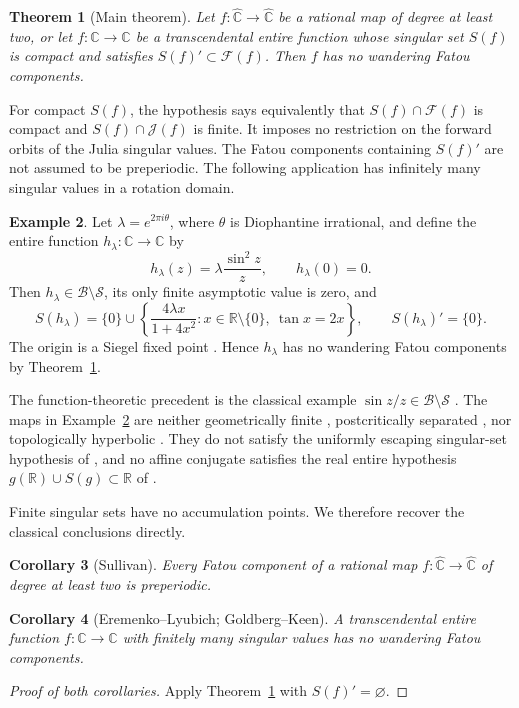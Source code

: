 \documentclass[11pt,reqno]{amsart}
\newcommand{\C}{\mathbb C}
\newcommand{\R}{\mathbb R}
\newcommand{\sphere}{\widehat{\mathbb C}}
\newcommand{\Fat}{\mathcal F}
\newcommand{\Jul}{\mathcal J}
\newtheorem{theorem}{Theorem}[section]
\newtheorem{corollary}[theorem]{Corollary}
\theoremstyle{definition}
\newtheorem{example}[theorem]{Example}
\numberwithin{equation}{section}
\begin{document}
\begin{theorem}[Main theorem]\label{core:singular-accumulation}
Let $f:\sphere\to\sphere$ be a rational map of degree at least two,
or let $f:\C\to\C$ be a transcendental entire function whose singular
set $S(f)$ is compact and satisfies $S(f)'\subset\Fat(f)$.
Then $f$ has no wandering Fatou components.
\end{theorem}

For compact $S(f)$, the hypothesis says equivalently that
$S(f)\cap\Fat(f)$ is compact and $S(f)\cap\Jul(f)$ is finite. It
imposes no restriction on the forward orbits of the Julia singular
values. The Fatou components containing $S(f)'$ are not assumed to be
preperiodic. The following application has infinitely many singular
values in a rotation domain.

\begin{example}\label{example:sine}
Let $\lambda=e^{2\pi i\theta}$, where $\theta$ is Diophantine irrational,
and define the entire function $h_\lambda:\C\to\C$ by
\[
 h_\lambda(z)=\lambda\frac{\sin^2z}{z},\qquad h_\lambda(0)=0.
\]
Then $h_\lambda\in\mathcal B\setminus\mathcal S$, its only finite
asymptotic value is zero, and
\begin{equation}\label{eq:sine-singular}
 S(h_\lambda)=\{0\}\cup
 \left\{\frac{4\lambda x}{1+4x^2}:
 x\in\R\setminus\{0\},\ \tan x=2x\right\},
 \qquad S(h_\lambda)'=\{0\}.
\end{equation}
The origin is a Siegel fixed point \cite{Siegel}. Hence $h_\lambda$ has no wandering
Fatou components by Theorem~\ref{core:singular-accumulation}.
\end{example}

The function-theoretic precedent is the classical example
$\sin z/z\in\mathcal B\setminus\mathcal S$
\cite[Section~4.2]{Sixsmith}. The maps in Example~\ref{example:sine}
are neither geometrically finite \cite[Proposition~5.3]{ARS}, postcritically
separated \cite[Lemma~2.6]{PS}, nor topologically hyperbolic
\cite[Definition~1.2]{BFJK}. They do not satisfy the uniformly escaping
singular-set hypothesis of \cite[Theorem~1.2]{MBRG}, and no affine
conjugate satisfies the real entire hypothesis
$g(\R)\cup S(g)\subset\R$ of \cite[Theorem~1.3]{MBRG}.

Finite singular sets have no accumulation points. We therefore recover
the classical conclusions directly.

\begin{corollary}[Sullivan]\label{core:sullivan}
Every Fatou component of a rational map $f:\sphere\to\sphere$ of
degree at least two is preperiodic.
\end{corollary}
\begin{corollary}[Eremenko--Lyubich; Goldberg--Keen]\label{core:el}
A transcendental entire function $f:\C\to\C$ with finitely many
singular values has no wandering Fatou components.
\end{corollary}
\begin{proof}[Proof of both corollaries]
Apply Theorem~\ref{core:singular-accumulation} with $S(f)'=\varnothing$.
\end{proof}
\end{document}

